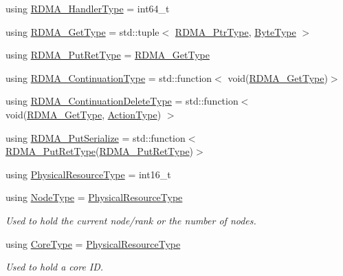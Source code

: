 \begin{DoxyCompactItemize}
using \hyperlink{namespacevt_a9530efb893c0f3846e8ac5f0507e0f49}{R\+D\+M\+A\+\_\+\+Handler\+Type} = int64\+\_\+t
\item 
using \hyperlink{namespacevt_a1cab7f4860f65a49ad2c042d6240f288}{R\+D\+M\+A\+\_\+\+Get\+Type} = std\+::tuple$<$ \hyperlink{namespacevt_a9e2c953286c7616f7c218e9951790776}{R\+D\+M\+A\+\_\+\+Ptr\+Type}, \hyperlink{namespacevt_aab8d55968084610ce3b17057981e9300}{Byte\+Type} $>$
\item 
using \hyperlink{namespacevt_a50fcc3338d68f7b147b99c0a82ec3a10}{R\+D\+M\+A\+\_\+\+Put\+Ret\+Type} = \hyperlink{namespacevt_a1cab7f4860f65a49ad2c042d6240f288}{R\+D\+M\+A\+\_\+\+Get\+Type}
\item 
using \hyperlink{namespacevt_a9880273f1697d78c2171f8d8f044de51}{R\+D\+M\+A\+\_\+\+Continuation\+Type} = std\+::function$<$ void(\hyperlink{namespacevt_a1cab7f4860f65a49ad2c042d6240f288}{R\+D\+M\+A\+\_\+\+Get\+Type})$>$
\item 
using \hyperlink{namespacevt_a4dfad0b5809d9812d60a0311a45ae0c2}{R\+D\+M\+A\+\_\+\+Continuation\+Delete\+Type} = std\+::function$<$ void(\hyperlink{namespacevt_a1cab7f4860f65a49ad2c042d6240f288}{R\+D\+M\+A\+\_\+\+Get\+Type}, \hyperlink{namespacevt_ae0a5a7b18cc99d7b732cb4d44f46b0f3}{Action\+Type}) $>$
\item 
using \hyperlink{namespacevt_abeb0129c92a5721f6f2c01b621f149fe}{R\+D\+M\+A\+\_\+\+Put\+Serialize} = std\+::function$<$ \hyperlink{namespacevt_a50fcc3338d68f7b147b99c0a82ec3a10}{R\+D\+M\+A\+\_\+\+Put\+Ret\+Type}(\hyperlink{namespacevt_a50fcc3338d68f7b147b99c0a82ec3a10}{R\+D\+M\+A\+\_\+\+Put\+Ret\+Type})$>$
\item 
using \hyperlink{namespacevt_a2dc36fcada816dc6d11774d650328ee9}{Physical\+Resource\+Type} = int16\+\_\+t
\item 
using \hyperlink{namespacevt_a866da9d0efc19c0a1ce79e9e492f47e2}{Node\+Type} = \hyperlink{namespacevt_a2dc36fcada816dc6d11774d650328ee9}{Physical\+Resource\+Type}
\begin{DoxyCompactList}\small\item\em Used to hold the current node/rank or the number of nodes. \end{DoxyCompactList}\item 
using \hyperlink{namespacevt_a74b11b22c02feaabab8591acc87c7c52}{Core\+Type} = \hyperlink{namespacevt_a2dc36fcada816dc6d11774d650328ee9}{Physical\+Resource\+Type}
\begin{DoxyCompactList}\small\item\em Used to hold a core ID. \end{DoxyCompactList}\item 

\end{DoxyCompactItemize}
